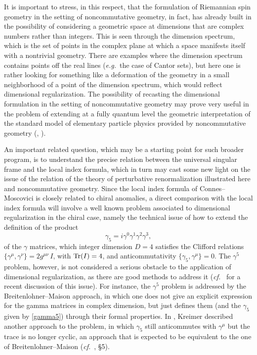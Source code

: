 \documentclass[10pt]{amsart}
\def\Tr{{\rm Tr}}
\newcommand{\eg}{{\it e.g.\/}\ }
\newcommand{\cf}{{\it cf.\/}\ }
\numberwithin{equation}{section}
\begin{document}
\smallskip

It is important to stress, in this respect, that the formulation
of Riemannian spin geometry in the setting of noncommutative
geometry, in fact, has already built in the possibility of
considering a geometric space at dimensions that are complex
numbers rather than integers. This is seen through the dimension
spectrum, which is the set of points in the complex plane at which
a space manifests itself with a nontrivial geometry. There are
examples where the dimension spectrum contains points off the real
lines (\eg the case of Cantor sets), but here one is rather
looking for something like a deformation of the geometry in a
small neighborhood of a point of the dimension spectrum, which
would reflect dimensional regularization. The possibility of
recasting the dimensional formulation in the setting of
noncommutative geometry may prove very useful in the problem of
extending at a fully quantum level the geometric interpretation of
the standard model of elementary particle physics provided by
noncommutative geometry (\cite{CoSM}, \cite{ChCo}).

\smallskip

An important related question, which may be a starting point for
such broader program, is to understand the precise relation
between the universal singular frame and the local index formula,
which in turn may cast some new light on the issue of the relation
of the theory of perturbative renormalization illustrated here and
noncommutative geometry. Since the local index formula of
Connes--Moscovici is closely related to chiral anomalies, a direct
comparison with the local index formula will involve a well known
problem associated to dimensional regularization in the chiral
case, namely the technical issue of how to extend the definition
of the product
\begin{equation}\label{gamma5}
 \gamma_5= i \gamma^0\gamma^1\gamma^2\gamma^3,
\end{equation}
of the $\gamma$ matrices, which integer dimension $D=4$ satisfies
the Clifford relations $\{ \gamma^\mu,\gamma^\nu \} = 2
g^{\mu\nu}\, I$, with $\Tr(I)=4$, and anticommutativity $\{
\gamma_5, \gamma^\mu \} =0$. The $\gamma^5$ problem, however, is
not considered a serious obstacle to the application of
dimensional regularization, as there are good methods to address
it (\cf \cite{MSR} for a recent discussion of this issue). For
instance, the $\gamma^5$ problem is addressed by the
Breitenlohner--Maison approach, in which one does not give an
explicit expression for the gamma matrices in complex dimension,
but just defines them (and the $\gamma_5$ given by \eqref{gamma5})
through their formal properties. In \cite{DK1}, Kreimer described
another approach to the problem, in which $\gamma_5$ still
anticommutes with $\gamma^\mu$ but the trace is no longer cyclic, an
approach that is expected to be equivalent to the one of
Breitenlohner--Maison (\cf \cite{DK1}, \S 5).
\end{document}
